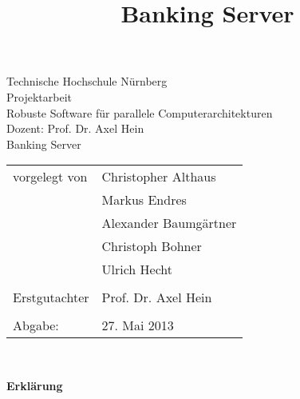 \documentclass[10pt,a4paper]{article}
\begin{document}
\title{Banking Server}


\begin{titlepage}
\vspace*{1cm}
\begin{center}
\Huge
Technische Hochschule Nürnberg\\
\vspace*{2cm}
\large
Projektarbeit\\ Robuste Software für parallele Computerarchitekturen\\
Dozent: Prof. Dr. Axel Hein\\
\vspace*{2cm}
\Huge
Banking Server\\
\vspace{1cm}
\large
\vspace{2cm}

 \begin{tabular}{p{6 cm}p{6 cm}}
    	vorgelegt von & {Christopher Althaus} \\
		& {Markus Endres} \\
		& {Alexander Baumgärtner} \\
		& {Christoph Bohner} \\
		& {Ulrich Hecht} \\ & \\
    	Erstgutachter & {Prof. Dr. Axel Hein}\\ & \\
    	Abgabe:& 27. Mai 2013
 \end{tabular}\\
    


\end{center}
\end{titlepage}

\clearpage\thispagestyle{empty}
\begin{center}\textbf{\large Erklärung}\end{center}
\end{document}
